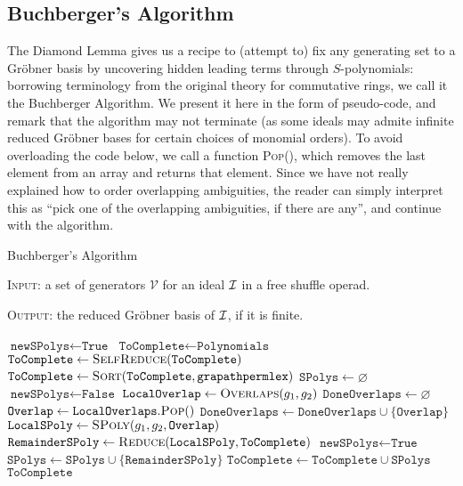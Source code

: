 \subsection{Buchberger's Algorithm}

The Diamond Lemma gives us a recipe to (attempt to) fix any 
generating set to a Gr\"obner basis by uncovering hidden
leading terms through $S$-polynomials: borrowing terminology
from the original theory for commutative rings, we call it
the Buchberger Algorithm. We present it here in the form
of pseudo-code, and remark that the algorithm may not
terminate (as some ideals may admite infinite reduced 
Gr\"obner bases for certain choices of monomial orders).
To avoid overloading the code below,
we call a function \textsc{Pop}(), which removes the last element
from an array and returns that element. Since we have not
really explained how to order overlapping ambiguities, the
reader can simply interpret this as ``pick one of the
overlapping ambiguities, if there are any'', and continue with
the algorithm.

 \begin{algorithm}
\caption{Buchberger's Algorithm}\label{algo:self-reduce}
\textsc{Input:} a set of generators $\mathcal V$ for an ideal $\mathcal{I}$
in a free shuffle operad. 

\textsc{Output:} the reduced Gr\"obner basis of $\mathcal{I}$,
if it is finite.

\begin{adjustwidth}{0 cm}{2 cm}
\begin{algorithmic}[1]
	\State $\texttt{newSPolys} \gets \texttt{True}$
	\State $\texttt{ToComplete} \gets \texttt{Polynomials}$
		\State $\texttt{ToComplete} \gets 
					\textsc{SelfReduce}(\texttt{ToComplete})$
		\State $\texttt{ToComplete} 
					\gets \textsc{Sort}(\texttt{ToComplete},
								\texttt{grapathpermlex})$
		\State $\texttt{SPolys} \gets \varnothing$
		\State $\texttt{newSPolys} \gets \texttt{False}$
			\State $\texttt{LocalOverlap}\gets
			 \textsc{Overlaps}(g_1,g_2)$
			 \State $\texttt{DoneOverlaps} \gets \varnothing$
			\State $\texttt{Overlap} \gets 	
				\texttt{LocalOverlaps}.\textsc{Pop}()$
			\State $\texttt{DoneOverlaps}\gets \texttt{DoneOverlaps}\cup \{ \texttt{Overlap} \}$
			\State $\texttt{LocalSPoly} \gets 
				\textsc{SPoly}(g_1,g_2,\texttt{Overlap}) $
			\State $\texttt{RemainderSPoly} \gets \textsc{Reduce}(
			\texttt{LocalSPoly},\texttt{ToComplete})$
				\State $\texttt{newSPolys} 
					\gets \texttt{True}$
				\State $\texttt{SPolys}\gets\texttt{SPolys}\cup \{\texttt{RemainderSPoly}\}$
				\EndIf
				\EndWhile
			\EndFor
			\State  
				$\texttt{ToComplete}\gets \texttt{ToComplete}\cup \texttt{SPolys}$
\EndWhile
\State \Return $\texttt{ToComplete}$
\EndProcedure
\end{algorithmic}
\end{adjustwidth}
\end{algorithm}

